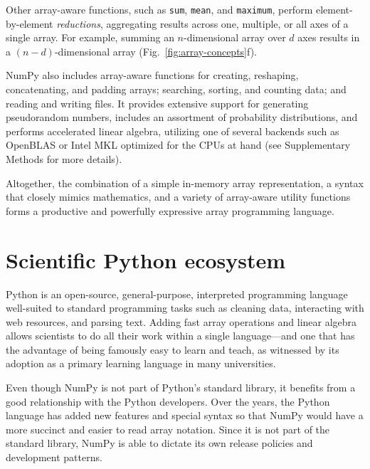 \documentclass[twocolumn]{article}
\begin{document}
Other array-aware functions, such as \texttt{sum}, \texttt{mean}, and \texttt{maximum}, perform
element-by-element \emph{reductions}, aggregating results across one,
multiple, or all axes of a single array.
For example, summing an $n$-dimensional array over $d$ axes results in a
$(n-d)$-dimensional array (Fig.~\ref{fig:array-concepts}f).

NumPy also includes array-aware functions for creating, reshaping, concatenating, and padding
arrays; searching, sorting, and counting data; and reading and writing files.
It provides extensive support for generating pseudorandom numbers,
includes an assortment of probability distributions, and
performs accelerated linear algebra, utilizing one of several backends
such as OpenBLAS \cite{wang2013augem,xianyi2012model} or Intel MKL optimized
for the CPUs at hand (see Supplementary Methods for more details).

Altogether, the combination of a simple in-memory array
representation, a syntax that closely mimics mathematics, and a
variety of array-aware utility functions forms a productive and
powerfully expressive array programming language.



\section*{Scientific Python ecosystem}

Python is an open-source, general-purpose, interpreted programming language
well-suited to standard programming tasks such as cleaning data,
interacting with web resources, and parsing text.
Adding fast array operations and linear algebra allows scientists to do all
their work within a single language---and one that has the advantage of
being famously easy to learn and teach, as witnessed by its adoption
as a primary learning language in many universities.

Even though NumPy is not part of Python's standard library,
it benefits from a good relationship with the Python developers.
Over the years, the Python language has added new features and
special syntax so that NumPy would have a more succinct and 
easier to read array notation.
Since it is not part of the standard library, NumPy is able to
dictate its own release policies and development patterns.
\end{document}

